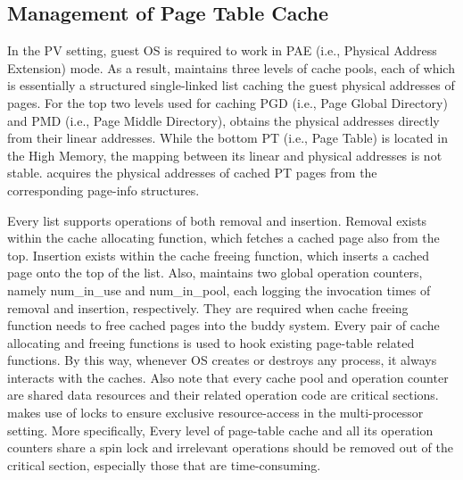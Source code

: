 \subsection{Management of Page Table Cache}

In the PV setting, guest OS is required to work in PAE (i.e., Physical Address Extension) mode. As a result, \name maintains three levels of cache pools, each of which is essentially a structured single-linked list caching the guest physical addresses of pages. For the top two levels used for caching PGD (i.e., Page Global Directory) and PMD (i.e., Page Middle Directory), \name obtains the physical addresses directly from their linear addresses. While the bottom PT (i.e., Page Table) is located in the High Memory, the mapping between its linear and physical addresses is not stable. \name acquires the physical addresses of cached PT pages from the corresponding page-info structures.

Every list supports operations of both removal and insertion. Removal exists within the cache allocating function, which fetches a cached page also from the top. Insertion exists within the cache freeing function, which inserts a cached page onto the top of the list. Also, \name maintains two global operation counters, namely num\_in\_use and num\_in\_pool, each logging the invocation times of removal and insertion, respectively. They are required when cache freeing function needs to free cached pages into the buddy system. Every pair of cache allocating and freeing functions is used to hook existing page-table related functions. By this way, whenever OS creates or destroys any process, it always interacts with the caches. Also note that every cache pool and operation counter are shared data resources and their related operation code are critical sections. \name makes use of locks to ensure exclusive resource-access in the multi-processor setting. More specifically, Every level of page-table cache and all its operation counters share a spin lock and irrelevant operations should be removed out of the critical section, especially those that are time-consuming.

